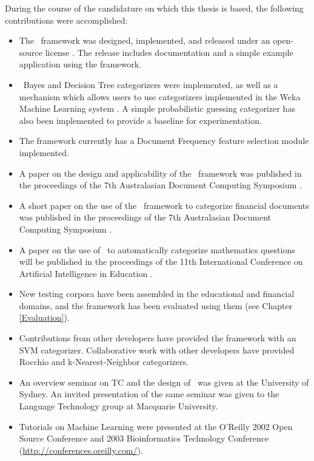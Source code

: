 During the course of the candidature on which this thesis is based,
the following contributions were accomplished:

\begin{itemize}
\item The \aicat\ framework was designed, implemented, and released
  under an open-source license \cite{cpan}.  The release includes
  documentation and a simple example application using the framework.
\item \naive\ Bayes and Decision Tree categorizers were implemented,
  as well as a mechanism which allows users to use categorizers
  implemented in the Weka Machine Learning system \cite{weka:99}.  A
  simple probabilistic guessing categorizer has also been implemented
  to provide a baseline for experimentation.
\item The framework currently has a Document Frequency feature
  selection module implemented.
\item A paper on the design and applicability of the \aicat\ framework
  was published in the proceedings of the 7th Australasian Document
  Computing Symposium \cite{williams:02}.
\item A short paper on the use of the \aicat\ framework to categorize
  financial documents was published in the proceedings of the
  7th Australasian Document Computing Symposium \cite{calvo:02}.
\item A paper on the use of \aicat\ to automatically categorize
  mathematics questions will be published in the
  proceedings of the 11th International Conference on Artificial Intelligence in
  Education \cite{williams:03}.
\item New testing corpora have been assembled in the educational and
  financial domains, and the framework has been evaluated using them
  (see Chapter \ref{Evaluation}).
\item Contributions from other developers have provided the framework
  with an SVM categorizer.  Collaborative work with other developers
  have provided Rocchio and k-Nearest-Neighbor categorizers.
\item An overview seminar on TC and the design of \aicat\ was given at
  the University of Sydney.  An invited presentation of the same
  seminar was given to the Language Technology group at Macquarie
  University.
\item Tutorials on Machine Learning were presented at the O'Reilly
  2002 Open Source Conference and 2003 Bioinformatics Technology
  Conference (\url{http://conferences.oreilly.com/}).
\end{itemize}

